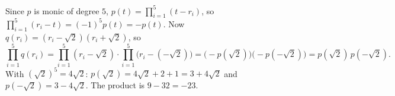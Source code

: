 Since $p$ is monic of degree $5$, $p(t)=\prod_{i=1}^{5}(t-r_i)$, so $\prod_{i=1}^5(r_i-t)=(-1)^5p(t)=-p(t)$. Now $q(r_i)=(r_i-\sqrt2)(r_i+\sqrt2)$, so
\[
\prod_{i=1}^5q(r_i)=\prod_{i=1}^5(r_i-\sqrt2)\cdot\prod_{i=1}^5\bigl(r_i-(-\sqrt2)\bigr)=\bigl(-p(\sqrt2)\bigr)\bigl(-p(-\sqrt2)\bigr)=p(\sqrt2)\,p(-\sqrt2).
\]
With $(\sqrt2)^5=4\sqrt2$: $p(\sqrt2)=4\sqrt2+2+1=3+4\sqrt2$ and $p(-\sqrt2)=3-4\sqrt2$. The product is $9-32=\boxed{-23}$.
